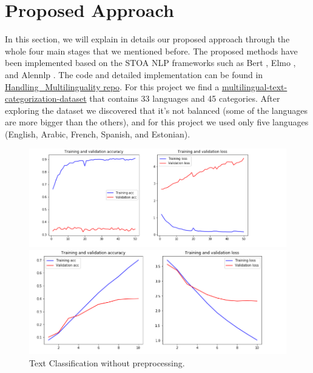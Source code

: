 \documentclass[letterpaper,12pt]{article}
\begin{document}
\section{Proposed Approach}
In this section, we will explain in details our proposed approach through the whole four main stages that we mentioned before. The proposed methods have been implemented based on the STOA NLP frameworks such as Bert \cite{bert}, Elmo \cite{elmo}, and Alennlp \cite{allen}. The code and detailed implementation can be found in \href{https://github.com/nesmaAlmoazamy/Handling_Multilinguality }{Handling\_Multilinguality repo}. For this project we find a  
 \href{https://github.com/valeriano-manassero/multilingual-text-categorization-dataset}{multilingual-text-categorization-dataset} that contains 33 languages and 45 categories. After exploring the dataset we discovered that it's not balanced (some of the languages are more bigger than the others), and for this project we used only five languages (English, Arabic, French, Spanish, and Estonian).




\begin{figure}
	\centering
	\begin{minipage}[b]{.4\textwidth}
		\centering \includegraphics[width=0.8\columnwidth]{w.png}
		
		\caption{
			\label{fig:3} %
			Text classification with preprocessing
		}
		
	\end{minipage}\qquad
	\begin{minipage}[b]{.4\textwidth}
		
		\centering \includegraphics[width=0.8\columnwidth]{without.png}
		
		\caption{
			\label{fig:4} %
			Text Classification without preprocessing.
		}
		
	\end{minipage}
\end{figure}
\end{document}
